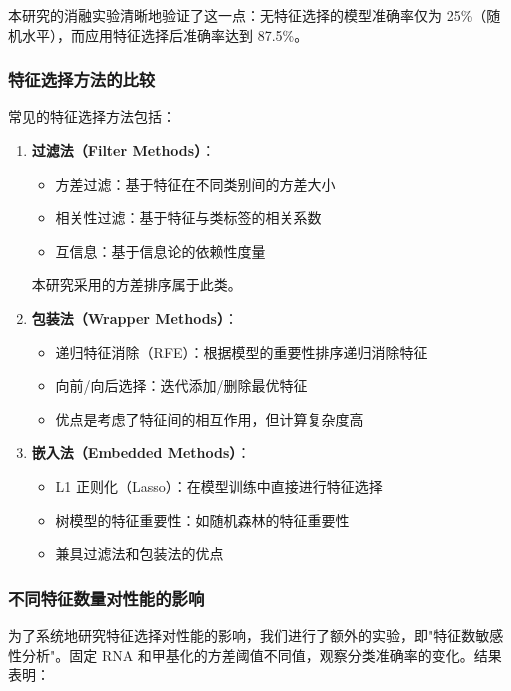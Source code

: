 本研究的消融实验清晰地验证了这一点：无特征选择的模型准确率仅为 25\%（随机水平），而应用特征选择后准确率达到 87.5\%。

\subsubsection{特征选择方法的比较}

常见的特征选择方法包括：

\begin{enumerate}
    \item \textbf{过滤法（Filter Methods）}：
    \begin{itemize}
        \item 方差过滤：基于特征在不同类别间的方差大小
        \item 相关性过滤：基于特征与类标签的相关系数
        \item 互信息：基于信息论的依赖性度量
    \end{itemize}
    本研究采用的方差排序属于此类。
    
    \item \textbf{包装法（Wrapper Methods）}：
    \begin{itemize}
        \item 递归特征消除（RFE）：根据模型的重要性排序递归消除特征
        \item 向前/向后选择：迭代添加/删除最优特征
        \item 优点是考虑了特征间的相互作用，但计算复杂度高
    \end{itemize}
    
    \item \textbf{嵌入法（Embedded Methods）}：
    \begin{itemize}
        \item L1 正则化（Lasso）：在模型训练中直接进行特征选择
        \item 树模型的特征重要性：如随机森林的特征重要性
        \item 兼具过滤法和包装法的优点
    \end{itemize}
\end{enumerate}

\subsubsection{不同特征数量对性能的影响}

为了系统地研究特征选择对性能的影响，我们进行了额外的实验，即"特征数敏感性分析"。固定 RNA 和甲基化的方差阈值不同值，观察分类准确率的变化。结果表明：

